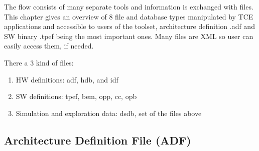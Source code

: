 \documentclass[twoside]{tceusermanual}
\begin{document}
The flow consists of many separate tools and information is exchanged
with files.  This chapter gives an overview of 8 file and database
types manipulated by TCE applications and accessible to users of the
toolset, architecture definition .adf and SW binary
.tpef being the most important ones. Many files are XML so
user can easily access them, if needed.

There a 3 kind of files:

\begin{enumerate}
 \item HW definitions: adf, hdb, and idf
 \item SW definitions: tpef, bem, opp, cc, opb
 \item Simulation and exploration data: dsdb, set of the files above
\end{enumerate}






\subsection{Architecture Definition File (ADF)}
\label{sec:adf}
\end{document}
